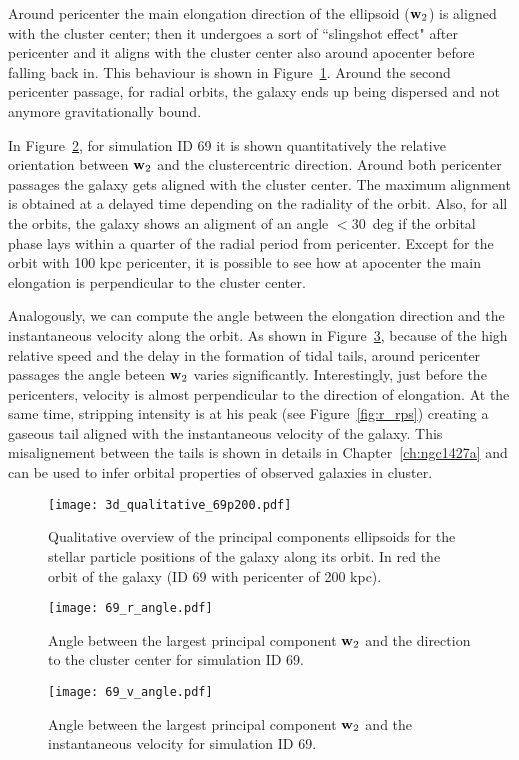 Around pericenter the main elongation direction of the ellipsoid ($\boldsymbol{\mathbf{w}}_2$) is aligned with the cluster center; then it undergoes a sort of ``slingshot effect" after pericenter and it aligns with the cluster center also around apocenter before falling back in. This behaviour is shown in Figure~\ref{fig:pca}.
Around the second pericenter passage, for radial orbits, the galaxy ends up being dispersed and not anymore gravitationally bound.

In Figure~\ref{fig:pca_angle_r}, for simulation ID 69 it is shown quantitatively the relative orientation between $\boldsymbol{\mathbf{w}}_2$ and the clustercentric direction.
Around both pericenter passages the galaxy gets aligned with the cluster center.
The maximum alignment is obtained at a delayed time depending on the radiality of the orbit.
Also, for all the orbits, the galaxy shows an aligment of an angle $<30$~deg if the orbital phase lays within a quarter of the radial period from pericenter. %
Except for the orbit with 100 kpc pericenter, it is possible to see how at apocenter the main elongation is perpendicular to the cluster center. %

Analogously, we can compute the angle between the elongation direction and the instantaneous velocity along the orbit.
As shown in Figure~\ref{fig:pca_angle_v}, because of the high relative speed and the delay in the formation of tidal tails, around pericenter passages the angle beteen $\boldsymbol{\mathbf{w}}_2$ varies significantly.
Interestingly, just before the pericenters, velocity is almost perpendicular to the direction of elongation.
At the same time, stripping intensity is at his peak (see Figure~\ref{fig:r_rps}) creating a gaseous tail aligned with the instantaneous velocity of the galaxy.
This misalignement between the tails is shown in details in Chapter~\ref{ch:ngc1427a} and can be used to infer orbital properties of observed galaxies in cluster.

\begin{figure}
\centering
\texttt{[image: 3d\_qualitative\_69p200.pdf]}
\caption{Qualitative overview of the principal components ellipsoids for the stellar particle positions of the galaxy along its orbit.
In red the orbit of the galaxy (ID 69 with pericenter of 200 kpc).}
\label{fig:pca}
\end{figure}

\begin{figure}
\centering
\texttt{[image: 69\_r\_angle.pdf]}
\caption{Angle between the largest principal component $\boldsymbol{\mathbf{w}}_2$ and the direction to the cluster center for simulation ID 69.}
\label{fig:pca_angle_r}
\end{figure}
\begin{figure}
\centering
\texttt{[image: 69\_v\_angle.pdf]}
\caption{Angle between the largest principal component $\boldsymbol{\mathbf{w}}_2$ and the instantaneous velocity for simulation ID 69.}
\label{fig:pca_angle_v}
\end{figure}

